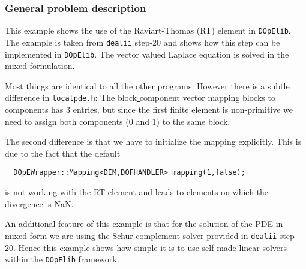 \subsubsection{General problem description}
This example shows the use of the Raviart-Thomas (RT) element in \texttt{DOpElib}. The example 
is taken from \texttt{dealii} step-20 and shows how this step can be implemented in \texttt{DOpElib}. The vector valued Laplace equation is solved in the mixed formulation.

Most things are identical to all the other programs. However there is a subtle difference in 
\texttt{localpde.h}: The block\underline{ }component vector mapping
blocks to components has 3 entries, but since the first finite element
is non-primitive we need to assign both components (0 and 1) to the
same block.

The second difference is that we have to initialize the mapping explicitly. This is due to the fact that the 
default 
\begin{verbatim}
  DOpEWrapper::Mapping<DIM,DOFHANDLER> mapping(1,false);
\end{verbatim}
is not working with the RT-element and leads to elements on which the divergence is NaN.

An additional feature of this example is that for the solution of the PDE in mixed form we are using the 
Schur complement solver provided in \texttt{dealii} step-20. Hence this example shows how simple it is to 
use self-made linear solvers within the \texttt{DOpElib} framework.